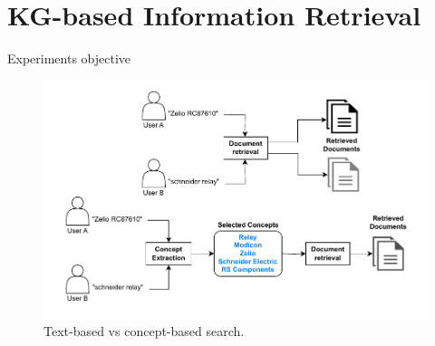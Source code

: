 \section[KG-based IR]{KG-based Information Retrieval}

\begin{frame}{Experiments objective}


    \begin{figure} [H]
        \begin{center}
            \includegraphics[scale=0.5]{images/text-vs-concept-based-search.pdf} 
            \caption{Text-based vs concept-based search.} 
        \end{center}
    \end{figure}

\end{frame}

